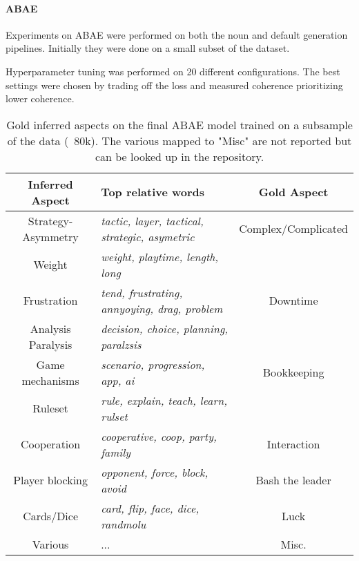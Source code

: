 \paragraph{ABAE}
Experiments on ABAE were performed on both the noun and default generation pipelines.
Initially they were done on a small subset of the dataset.

Hyperparameter tuning was performed on 20 different configurations.
The best settings were chosen by trading off the loss and measured coherence prioritizing lower coherence.

\begin{center}
    \begin{table}
        \begin{tabular}{c l c}
            \hline
            Inferred Aspect    & Top relative words                                     & Gold Aspect \\ [0.5ex]
            \hline\hline
            Strategy-Asymmetry & \textit{tactic, layer, tactical, strategic, asymetric} & Complex/Complicated \\
            Weight             & \textit{weight, playtime, length, long}                &                     \\
            \hline
            Frustration        & \textit{tend, frustrating, annyoying, drag, problem}   & Downtime            \\
            Analysis Paralysis & \textit{decision, choice, planning, paralzsis}         &                     \\
            \hline
            Game mechanisms    & \textit{scenario, progression, app, ai}                & Bookkeeping         \\
            Ruleset            & \textit{rule, explain, teach, learn, rulset}           &                     \\
            \hline
            Cooperation        & \textit{cooperative, coop, party, family}              & Interaction         \\
            \hline
            Player blocking    & \textit{opponent, force, block, avoid}                 & Bash the leader     \\
            \hline
            Cards/Dice         & \textit{card, flip, face, dice, randmolu}              & Luck                \\
            \hline
            Various            & ...                                                    & Misc.               \\
            \hline
        \end{tabular}
        \caption{Gold inferred aspects on the final ABAE model trained on a subsample of the data (~80k).
        The various mapped to "Misc" are not reported but can be looked up in the repository.
        }
        \label{best-80}
    \end{table}

\end{center}



